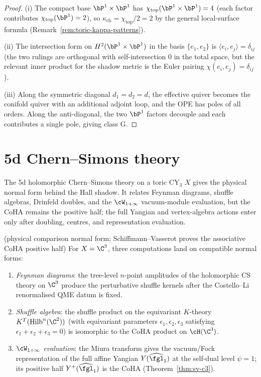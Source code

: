 \begin{proof}
(i) The compact base $\bP^1 \times \bP^1$ has $\chi_{\mathrm{top}}(\bP^1 \times \bP^1) = 4$ (each factor contributes $\chi_{\mathrm{top}}(\bP^1) = 2$), so $\kappa_{\mathrm{ch}} = \chi_{\mathrm{top}}/2 = 2$ by the general local-surface formula (Remark~\ref{rem:toric-kappa-patterns}).

(ii) The intersection form on $H^2(\bP^1 \times \bP^1)$ in the basis $\{e_1, e_2\}$ is $\langle e_i, e_j \rangle = \delta_{ij}$ (the two rulings are orthogonal with self-intersection $0$ in the total space, but the relevant inner product for the shadow metric is the Euler pairing $\chi(e_i, e_j) = \delta_{ij}$).

(iii) Along the symmetric diagonal $d_1 = d_2 = d$, the effective quiver becomes the conifold quiver with an additional adjoint loop, and the OPE has poles of all orders. Along the anti-diagonal, the two $\bP^1$ factors decouple and each contributes a single pole, giving class G.
\end{proof}

\section{5d Chern--Simons theory}
\label{sec:5d-cs}

The 5d holomorphic Chern--Simons theory on a toric CY$_3$ $X$ gives the
physical normal form behind the Hall shadow. It relates Feynman diagrams,
shuffle algebras, Drinfeld doubles, and the $\cW_{1+\infty}$
vacuum-module evaluation, but the CoHA remains the positive half; the
full Yangian and vertex-algebra actions enter only after doubling,
centres, and representation evaluation.

\begin{theorem}
\label{thm:5d-cs-c3}
\textup{(physical comparison normal form;
Schiffmann--Vasserot proves the associative CoHA positive half)}
For $X = \C^3$, three computations land on compatible normal forms:
\begin{enumerate}[label=(\roman*)]
 \item \emph{Feynman diagrams}: the tree-level $n$-point amplitudes of the holomorphic CS theory on $\C^3$ produce the perturbative shuffle kernels after the Costello--Li renormalised QME datum is fixed.
 \item \emph{Shuffle algebra}: the shuffle product on the equivariant $K$-theory $K^{T}(\mathrm{Hilb}^n(\C^2))$ (with equivariant parameters $\epsilon_1, \epsilon_2, \epsilon_3$ satisfying $\epsilon_1 + \epsilon_2 + \epsilon_3 = 0$) is isomorphic to the CoHA product on $\cH(\C^3)$.
 \item \emph{$\cW_{1+\infty}$ evaluation}: the Miura transform gives the vacuum/Fock representation of the full affine Yangian $Y(\widehat{\fgl}_1)$ at the self-dual level $\psi = 1$; its positive half $Y^+(\widehat{\fgl}_1)$ is the CoHA (Theorem~\ref{thm:sv-c3}).
\end{enumerate}
\end{theorem}


